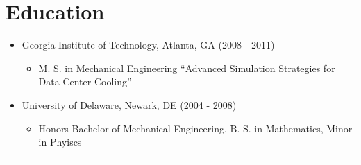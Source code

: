 \documentclass[10pt]{article}
\newenvironment{myitem}{
  \begin{itemize}
    \setlength{\itemsep}{1pt}
    \setlength{\parskip}{0pt}
    \setlength{\parsep}{0pt}
}{\end{itemize}}
\begin{document}
\section{Education}
\begin{myitem}
\item Georgia Institute of Technology, Atlanta, GA \hfill (2008 - 2011)
  \begin{myitem}
  \item M. S. in Mechanical Engineering ``Advanced Simulation Strategies for Data Center Cooling''
  \end{myitem}
\item University of Delaware, Newark, DE \hfill (2004 - 2008)
  \begin{myitem}
  \item Honors Bachelor of Mechanical Engineering, B. S. in Mathematics, Minor in Phyiscs
  \end{myitem}
\end{myitem}
%
\vfill
\hrule
\vspace{.2 cm}
\end{document}

